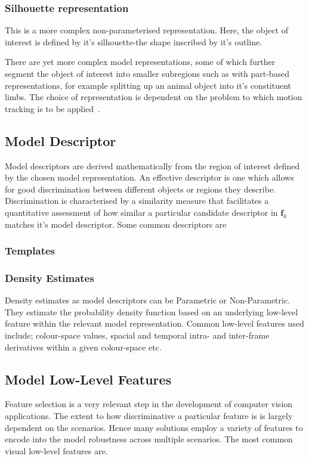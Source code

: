 \subsubsection{Silhouette representation}
This is a more complex non-parameterised representation. Here, the object of
interest is defined by it's silhouette-the shape inscribed by it's outline.

There are yet more complex model representations, some of which further segment
the object of interest into smaller subregions such as with part-based
representations, for example splitting up an animal object into it's constituent
limbs. The choice of representation is dependent on the problem to which motion
tracking is to be applied~\cite{Porikli2012}.

\subsection{Model Descriptor}
Model descriptors are derived mathematically from the region of interest defined
by the chosen model representation. An effective descriptor is one which allows
for good discrimination between different objects or regions they
describe. Discrimination is characterised by a similarity measure that
facilitates a quantitative assessment of how similar a particular candidate
descriptor in $\mathbf{f}_{k}$ matches it's model descriptor.
Some common descriptors are

\subsubsection{Templates}

\subsubsection{Density Estimates}
Density estimates as model descriptors can be Parametric or Non-Parametric. They
estimate the probability density function based on an underlying low-level
feature within the relevant model representation.
Common low-level features used include; colour-space values, spacial and
temporal intra- and inter-frame derivatives within a given colour-space etc.

\subsection{Model Low-Level Features}
Feature selection is a very relevant step in the development of computer vision
applications. The extent to how discriminative a particular feature is is
largely dependent on the scenarios. Hence many solutions employ a
variety of features to encode into the model robustness across multiple
scenarios. The most common visual low-level features are.

